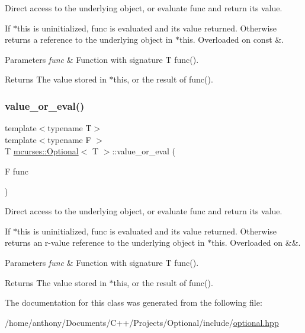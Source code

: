 Direct access to the underlying object, or evaluate {\ttfamily func} and return its value. 

If $\ast$this is uninitialized, {\ttfamily func} is evaluated and it\textquotesingle{}s value returned. Otherwise returns a reference to the underlying object in $\ast$this. Overloaded on const \&. 
\begin{DoxyParams}{Parameters}
{\em func} & Function with signature T func(). \\
\hline
\end{DoxyParams}
\begin{DoxyReturn}{Returns}
The value stored in $\ast$this, or the result of {\ttfamily func()}. 
\end{DoxyReturn}
\hypertarget{classmcurses_1_1Optional_ab90365e7ea0a567427f174085931caa4}{}\label{classmcurses_1_1Optional_ab90365e7ea0a567427f174085931caa4} 
\subsubsection{\texorpdfstring{value\+\_\+or\+\_\+eval()}{value\_or\_eval()}\hspace{0.1cm}{\footnotesize\ttfamily [2/2]}}
{\footnotesize\ttfamily template$<$typename T$>$ \\
template$<$typename F $>$ \\
T \hyperlink{classmcurses_1_1Optional}{mcurses\+::\+Optional}$<$ T $>$\+::value\+\_\+or\+\_\+eval (\begin{DoxyParamCaption}\item[{F}]{func }\end{DoxyParamCaption})\hspace{0.3cm}{\ttfamily [inline]}}



Direct access to the underlying object, or evaluate {\ttfamily func} and return its value. 

If $\ast$this is uninitialized, {\ttfamily func} is evaluated and it\textquotesingle{}s value returned. Otherwise returns an r-\/value reference to the underlying object in $\ast$this. Overloaded on \&\&. 
\begin{DoxyParams}{Parameters}
{\em func} & Function with signature T func(). \\
\hline
\end{DoxyParams}
\begin{DoxyReturn}{Returns}
The value stored in $\ast$this, or the result of {\ttfamily func()}. 
\end{DoxyReturn}


The documentation for this class was generated from the following file\+:\begin{DoxyCompactItemize}
\item 
/home/anthony/\+Documents/\+C++/\+Projects/\+Optional/include/\hyperlink{optional_8hpp}{optional.\+hpp}\end{DoxyCompactItemize}
